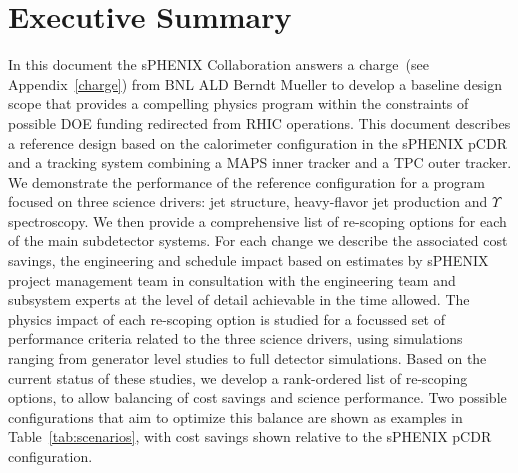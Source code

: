 \section*{Executive Summary}
\label{executive_summary}
\setcounter{page}{1}

\nocite{*}

In this document the sPHENIX Collaboration answers a charge~(see
Appendix~\ref{charge}) from BNL ALD Berndt Mueller to develop a
baseline design scope that provides a compelling physics program
within the constraints of possible DOE funding redirected from RHIC
operations. This document describes a reference design based on the
calorimeter configuration in the sPHENIX pCDR and a tracking system
combining a MAPS inner tracker and a TPC outer tracker. We
demonstrate the performance of the reference configuration for a 
program focused on three science drivers: jet
structure, heavy-flavor jet production and $\Upsilon$ spectroscopy.
We then provide a comprehensive list of re-scoping options for each of
the main subdetector systems. For each change we describe the
associated cost savings, the engineering and schedule impact based on
estimates by sPHENIX project management team in consultation with the engineering
team and subsystem experts at the level of detail achievable in the
time allowed.  The physics impact of each re-scoping option is studied
for a focussed set of performance criteria related to the three
science drivers, using simulations ranging from generator level
studies to full detector simulations. Based on the current status of
these studies, we develop a rank-ordered list of re-scoping options,
to allow balancing of cost savings and science
performance. Two possible configurations that aim to optimize this 
balance are shown as examples in Table~\ref{tab:scenarios},
with cost savings shown relative to the sPHENIX pCDR configuration.

